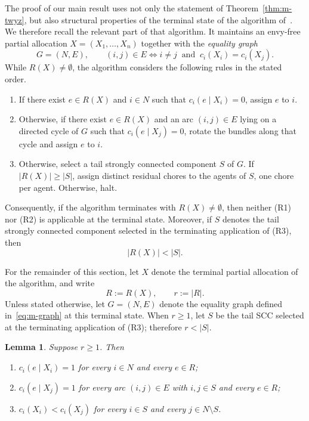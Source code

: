 \documentclass[sigconf,anonymous]{aamas}
\newcommand{\agents}{N}
\newcommand{\cost}{c}
\newcommand{\abs}[1]{\left\lvert#1\right\rvert}
\theoremstyle{acmplain}
\newtheorem{lemma}[theorem]{Lemma}
\theoremstyle{acmdefinition}
\theoremstyle{acmplain}
\begin{document}
The proof of our main result uses not only the statement of Theorem~\ref{thm:m-twyz}, but also structural properties of the terminal state of the algorithm of~\cite{tao2025existence}. We therefore recall the relevant part of that algorithm. It maintains an envy-free partial allocation $X=(X_1,\dots,X_n)$ together with the \emph{equality graph}
\begin{equation}
\label{eq:m-graph}
  G=(\agents,E),
  \qquad
  (i,j)\in E
  \iff
  i\ne j \ \text{ and }\ \cost_i(X_i)=\cost_i(X_j).
\end{equation}
While $R(X)\ne\emptyset$, the algorithm considers the following rules in the stated order.
\begin{enumerate}
  \item[(R1)] If there exist $e\in R(X)$ and $i\in\agents$ such that
        $\cost_i(e\mid X_i)=0$, assign $e$ to $i$.

  \item[(R2)] Otherwise, if there exist $e\in R(X)$ and an arc      $(i,j)\in E$ lying on a directed cycle of $G$ such that $\cost_i(e\mid X_j)=0$, rotate the bundles along that cycle and assign $e$ to $i$.

 \item[(R3)] Otherwise, select a tail strongly connected component $S$ of $G$. If $\abs{R(X)}\geq\abs S$, assign distinct residual chores to the agents of $S$, one chore per agent. Otherwise, halt. \end{enumerate}           Consequently, if the algorithm terminates with \(R(X)\neq\emptyset\), then neither (R1) nor (R2) is applicable at the terminal state. Moreover, if \(S\) denotes the tail strongly connected component selected in the terminating application of (R3), then
\[
    \abs{R(X)}<\abs S.
\]



For the remainder of this section, let $X$ denote the terminal partial allocation of the algorithm, and write
\[
    R:=R(X), \qquad r:=\abs R.
\]
Unless stated otherwise, let $G=(\agents,E)$ denote the equality graph defined in~\eqref{eq:m-graph} at this terminal state. When \(r\ge1\), let \(S\) be the tail SCC selected at the terminating application of (R3); therefore \(r<|S|\).


\begin{lemma}
\label{lem:m-terminal}
Suppose $r \ge 1$. Then
\begin{enumerate}
  \item[(i)] $\cost_i(e \mid X_i) = 1$ for every $i \in \agents$ and every $e \in R$;
  \item[(ii)] $\cost_i(e \mid X_j) = 1$ for every arc $(i,j) \in E$ with  $i,j \in S$ and every $e \in R$;
  \item[(iii)] $\cost_i(X_i) < \cost_i(X_j)$ for every $i \in S$ and every $j \in \agents \setminus S$.
\end{enumerate}
\end{lemma}
\end{document}
